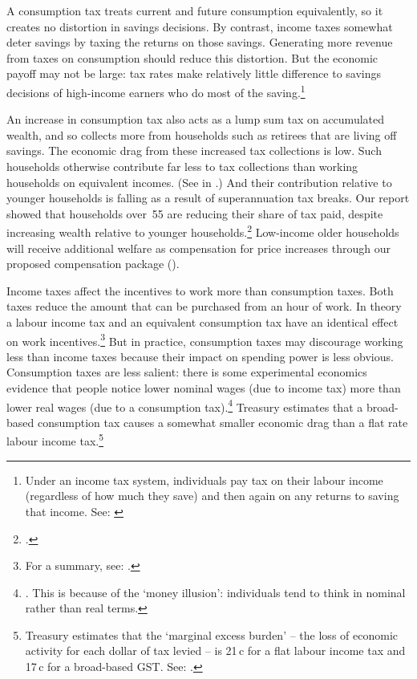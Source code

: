 A consumption tax treats current and future consumption equivalently, so it creates no distortion in savings decisions. By contrast, income taxes somewhat deter savings by taxing the returns on those savings.  Generating more revenue from taxes on consumption should reduce this distortion. But the economic payoff may not be large: tax rates make relatively little difference to savings decisions of high-income earners who do most of the saving.\footnote{Under an income tax system, individuals pay tax on their labour income (regardless of how much they save) and then again on any returns to saving that income. See: \textcite{HenryTaxReview2010}}    

An increase in consumption tax also acts as a lump sum tax on accumulated wealth, and so collects more from households such as retirees that are living off savings. The economic drag from these increased tax collections is low. Such households otherwise contribute far less to tax collections than working households on equivalent incomes. (See  in .)  And their contribution relative to younger households is falling as a result of superannuation tax breaks. Our report  showed that households over~55 are reducing their share of tax paid, despite increasing wealth relative to younger households.\footcite[][27]{DaleyWoodWeidmannEtAl2014}  Low-income older households will receive additional welfare as compensation for price increases through our proposed compensation package ().

Income taxes affect the incentives to work more than consumption taxes. Both taxes reduce the amount that can be purchased from an hour of work. In theory a labour income tax and an equivalent consumption tax have an identical effect on work incentives.\footnote{For a summary, see: \textcite[][458]{McCaffry2008}.}  But in practice, consumption taxes may discourage working less than income taxes because their impact on spending power is less obvious. Consumption taxes are less salient: there is some experimental economics evidence that people notice lower nominal wages (due to income tax) more than lower real wages (due to a consumption tax).\footnote{\textcites{BlumkinRuffleGanun2012}{SausgruberTyran2005}. This is because of the ‘money illusion’: individuals tend to think in nominal rather than real terms.}  Treasury estimates that a broad-based consumption tax causes a somewhat smaller economic drag than a flat rate labour income tax.\footnote{Treasury estimates that the ‘marginal excess burden’ – the loss of economic activity for each dollar of tax levied – is 21\,c for a flat labour income tax and 17\,c for a broad-based GST. See: \textcite[][25]{Treasury2015ReThink}.}  

